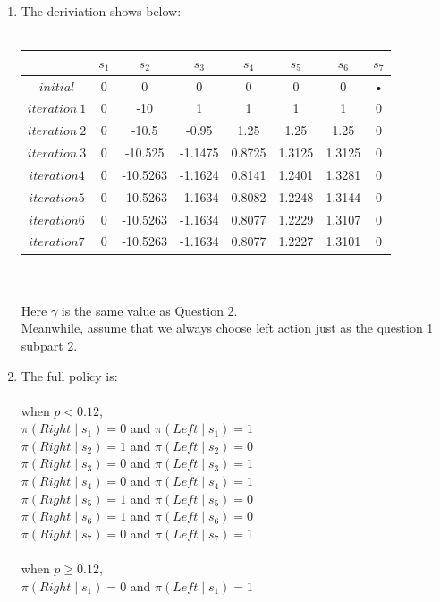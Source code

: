 \documentclass[12pt]{article}
\begin{document}
\begin{enumerate}
\item The deriviation shows below:\\\\
\begin{tabular}{|c|c|c|c|c|c|c|c|}
\hline 
 & $s_1$ & $s_2$ & $s_3$ & $s_4$ & $s_5$ & $s_6$ & $s_7$ \\
\hline 
$initial$ & 0 & 0 & 0 & 0 & 0 & 0 & • \\ 
\hline 
$iteration \ 1$ & 0 & -10 & 1 & 1 & 1 & 1 & 0 \\ 
\hline 
$iteration \ 2$ & 0 & -10.5 & -0.95 & 1.25 & 1.25 & 1.25 & 0 \\ 
\hline 
$iteration \ 3$ & 0 & -10.525 & -1.1475 & 0.8725 & 1.3125 & 1.3125 & 0 \\ 
\hline 
$iteration 4$ & 0 & -10.5263 & -1.1624 & 0.8141 & 1.2401 & 1.3281 & 0 \\ 
\hline 
$iteration 5$ & 0 & -10.5263 & -1.1634 & 0.8082 & 1.2248 & 1.3144 & 0 \\ 
\hline 
$iteration 6$ & 0 & -10.5263 & -1.1634 & 0.8077 & 1.2229 & 1.3107 & 0 \\ 
\hline 
$iteration 7$ & 0 & -10.5263 & -1.1634 & 0.8077 & 1.2227 & 1.3101 & 0 \\ 
\hline
\end{tabular}\\\\
Here $\gamma$ is the same value as Question 2.\\
Meanwhile, assume that we always choose left action just as the question 1 subpart 2.
\item The full policy is:\\\\
when $p < 0.12$,\\
$\pi(Right \mid s_1) = 0$ and $\pi(Left\mid s_1) = 1$\\
$\pi(Right \mid s_2) = 1$ and $\pi(Left\mid s_2) = 0$\\
$\pi(Right \mid s_3) = 0$ and $\pi(Left\mid s_3) = 1$\\
$\pi(Right \mid s_4) = 0$ and $\pi(Left\mid s_4) = 1$\\
$\pi(Right \mid s_5) = 1$ and $\pi(Left\mid s_5) = 0$\\
$\pi(Right \mid s_6) = 1$ and $\pi(Left\mid s_6) = 0$\\
$\pi(Right \mid s_7) = 0$ and $\pi(Left\mid s_7) = 1$\\\\
when $p \geq 0.12$,\\
$\pi(Right \mid s_1) = 0$ and $\pi(Left\mid s_1) = 1$\\

\end{enumerate}
\end{document}
